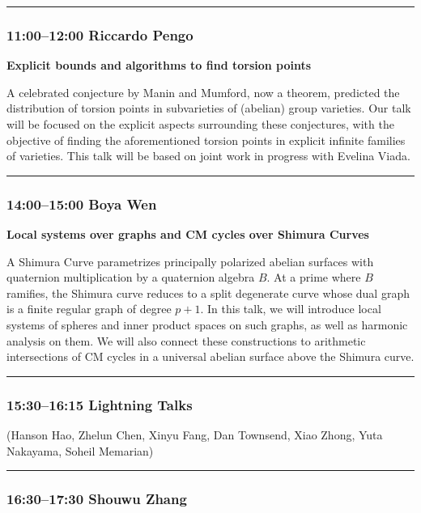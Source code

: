 \documentclass[11pt]{amsart}
\numberwithin{equation}{section}
\begin{document}
\bigskip
\hrule
\bigskip

\subsubsection*{11:00--12:00 \quad Riccardo Pengo}

\textbf{Explicit bounds and algorithms to find torsion points}

A celebrated conjecture by Manin and Mumford, now a theorem, predicted the distribution of torsion points in subvarieties of (abelian) group varieties. Our talk will be focused on the explicit aspects surrounding these conjectures, with the objective of finding the aforementioned torsion points in explicit infinite families of varieties. This talk will be based on joint work in progress with Evelina Viada.

\bigskip
\hrule
\bigskip

\subsubsection*{14:00--15:00 \quad Boya Wen}

\textbf{Local systems over graphs and CM cycles over Shimura Curves}

A Shimura Curve parametrizes principally polarized abelian surfaces with quaternion multiplication by a quaternion algebra $B$. At a prime where $B$ ramifies, the Shimura curve reduces to a split degenerate curve whose dual graph is a finite regular graph of degree $p+1$. In this talk, we will introduce local systems of spheres and inner product spaces on such graphs, as well as harmonic analysis on them. We will also connect these constructions to arithmetic intersections of CM cycles in a universal abelian surface above the Shimura curve.

\bigskip
\hrule
\bigskip

\subsubsection*{15:30--16:15 \quad Lightning Talks}
(Hanson Hao, Zhelun Chen, Xinyu Fang, Dan 	Townsend, Xiao Zhong, Yuta Nakayama, Soheil Memarian)

\bigskip
\hrule
\bigskip

\subsubsection*{16:30--17:30 \quad Shouwu Zhang}
\end{document}
